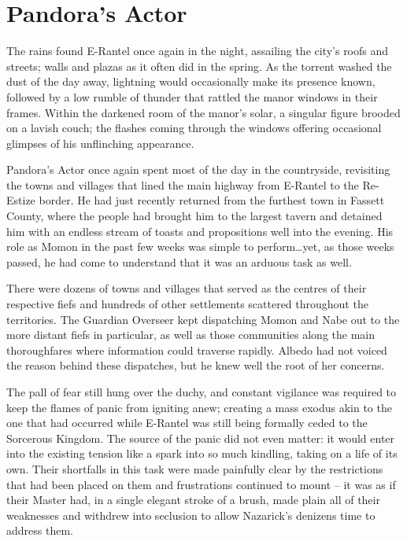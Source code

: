 \chapter{Pandora's Actor}

The rains found E-Rantel once again in the night, assailing the city’s roofs and streets; walls and plazas as it often did in the spring. As the torrent washed the dust of the day away, lightning would occasionally make its presence known, followed by a low rumble of thunder that rattled the manor windows in their frames. Within the darkened room of the manor’s solar, a singular figure brooded on a lavish couch; the flashes coming through the windows offering occasional glimpses of his unflinching appearance.

 

Pandora’s Actor once again spent most of the day in the countryside, revisiting the towns and villages that lined the main highway from E-Rantel to the Re-Estize border. He had just recently returned from the furthest town in Fassett County, where the people had brought him to the largest tavern and detained him with an endless stream of toasts and propositions well into the evening. His role as Momon in the past few weeks was simple to perform…yet, as those weeks passed, he had come to understand that it was an arduous task as well.

 

There were dozens of towns and villages that served as the centres of their respective fiefs and hundreds of other settlements scattered throughout the territories. The Guardian Overseer kept dispatching Momon and Nabe out to the more distant fiefs in particular, as well as those communities along the main thoroughfares where information could traverse rapidly. Albedo had not voiced the reason behind these dispatches, but he knew well the root of her concerns.

 

The pall of fear still hung over the duchy, and constant vigilance was required to keep the flames of panic from igniting anew; creating a mass exodus akin to the one that had occurred while E-Rantel was still being formally ceded to the Sorcerous Kingdom. The source of the panic did not even matter: it would enter into the existing tension like a spark into so much kindling, taking on a life of its own. Their shortfalls in this task were made painfully clear by the restrictions that had been placed on them and frustrations continued to mount – it was as if their Master had, in a single elegant stroke of a brush, made plain all of their weaknesses and withdrew into seclusion to allow Nazarick’s denizens time to address them.

